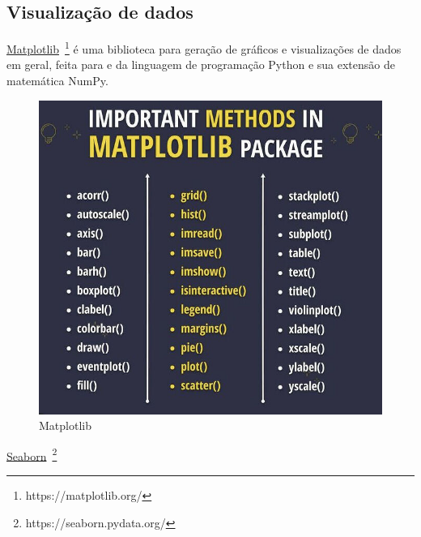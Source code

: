 \subsection{Visualização de dados}

\underline{Matplotlib}~\footnote{https://matplotlib.org/} é uma biblioteca para geração de gráficos e visualizações de dados em geral, feita para e da linguagem de programação Python e sua extensão de matemática NumPy.

\begin{figure}[!htp]
    \centering
    \includegraphics[scale=.9]{../img/python/matplotlib.jpeg}
    \caption{Matplotlib}
    \label{img:matplotlib}
\end{figure}


\underline{Seaborn}~\footnote{https://seaborn.pydata.org/}


